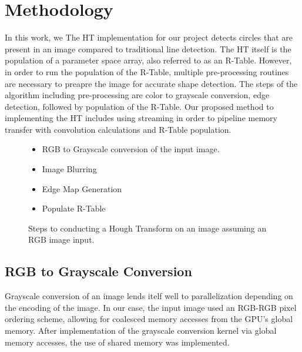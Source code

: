 \documentclass[conference]{IEEEtran}
\begin{document}
\section{Methodology}
In this work, we 
The HT implementation for our project detects circles that are present in an image compared to traditional line detection.
The HT itself is the population of a parameter space array, also referred to as an R-Table.
However, in order to run the population of the R-Table, multiple pre-processing routines are necessary to preapre the image for accurate shape detection.
The steps of the algorithm including pre-processing are color to grayscale conversion, edge detection, followed by population of the R-Table.
Our proposed method to implementing the HT includes using streaming in order to pipeline memory transfer with convolution calculations and R-Table population.



\begin{figure}[h]
  \begin{itemize}
    \item RGB to Grayscale conversion of the input image.
    \item Image Blurring 
    \item Edge Map Generation
    \item Populate R-Table
  \end{itemize}\caption{Steps to conducting a Hough Transform on an image assuming an RGB image input.}\label{figure:hough-transform-steps}
\end{figure}



\subsection{RGB to Grayscale Conversion}
Grayscale conversion of an image lends itelf well to parallelization depending on the encoding of the image.
In our case, the input image used an RGB-RGB pixel ordering scheme, allowing for coalesced memory accesses from the GPU's global memory.
After implementation of the grayscale conversion kernel via global memory accesses, the use of shared memory was implemented.
\end{document}
